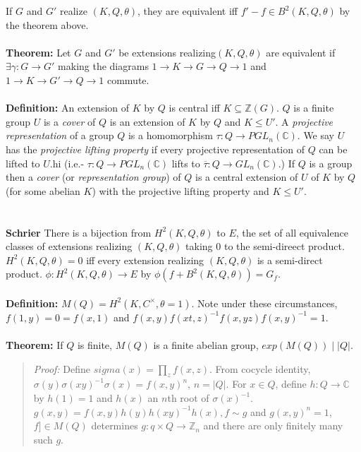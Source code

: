 If $G$ and $G'$ realize $(K, Q, \theta)$, they are equivalent iff $f' - f \in B^2(K, Q, \theta)$ by the theorem
above.
\\
\\
{\bf Theorem:} Let $G$ and $G'$ be extensions realizing$(K,Q, \theta)$ are equivalent if
$\exists \gamma: G \rightarrow G'$ making the diagrams
$1 \rightarrow K \rightarrow G \rightarrow Q \rightarrow 1$ and
$1 \rightarrow K \rightarrow G' \rightarrow Q \rightarrow 1$ commute.
\\
\\
{\bf Definition:} An extension of $K$ by $Q$ is central iff $ K \subseteq {\mathbb Z}(G)$.
$Q$ is a finite group $U$ is a \emph{cover} of $Q$
is an extension of $K$ by $Q$ and $K \leq U'$.
A \emph{projective representation} of a group $Q$ is a homomorphism
$\tau: Q \rightarrow PGL_n({\mathbb C})$.
We say $U$ has the \emph{projective lifting property} if every projective representation
of $Q$ can be lifted to $U$.hi (i.e.- $\tau:Q \rightarrow PGL_n({\mathbb C})$ lifts to
${\overline {\tau}}: Q \rightarrow GL_n({\mathbb C})$.)
If $Q$ is a group then a \emph{cover} (or \emph{representation group}) of $Q$ is a
central extension of $U$ of $K$ by $Q$ (for some abelian $K$) with the projective lifting property
and $K \le U'$.
\\
\\
\\
{\bf Schrier} There is a bijection from $H^2(K, Q, \theta)$ to $E$, the set of all equivalence classes
of extensions realizing $(K,Q,\theta)$ taking $0$ to the semi-direect product.  $H^2(K, Q, \theta) = 0$
iff every extension realizing $(K, Q, \theta)$ is a semi-direct product.  $\phi: H^2(K, Q, \theta) \rightarrow E$
by $\phi(f +  B^2(K,Q, \theta)) = G_{f}$.
\\
\\
{\bf Definition:} $M(Q)= H^2(K,C^{\times}, \theta = 1)$.  Note under these circumstances,
$f(1,y)= 0 = f(x,1)$ and $f(x,y)f(xt,z)^{-1}f(x,yz) f(x,y)^{-1}=1$.
\\
\\
{\bf Theorem:} If $Q$ is finite, $M(Q)$ is a finite abelian group, $exp(M(Q)) \mid |Q|$.
\begin{quote}
\emph{Proof:}
Define $sigma(x) = \prod_z f(x,z)$.  From cocycle identity,
$\sigma(y)\sigma(xy)^{-1}\sigma(x) = f(x,y)^n$, $n = |Q|$.
For $x \in Q$, define $h:Q \rightarrow {\mathbb C}$ by $h(1)=1$ and $h(x)$ an $n$th root of $\sigma(x)^{-1}$.
$g(x,y)=f(x,y)h(y)h(xy)^{-1}h(x), f \sim g$ and $g(x,y)^n =1$, $f] \in M(Q)$ determines
$g: q \times Q \rightarrow {\mathbb Z}_n$ and there are only finitely many such $g$.
\end{quote}

